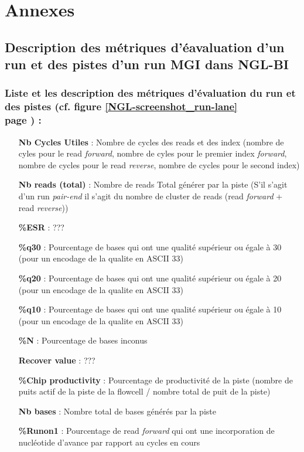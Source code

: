 \section{Annexes}
\subsection*{Description des métriques d'éavaluation d'un run et des pistes d'un run MGI dans NGL-BI}
\label{anexes1}
\subsubsection*{Liste et les description des métriques d'évaluation du run et des pistes (cf. figure \ref{NGL-screenshot_run-lane} \\page \pageref{NGL-screenshot_run-lane}) :}
\begin{itemize}
    \item[\textbf{Nb Cycles Utiles} :] Nombre de cycles des reads et des index (nombre de cyles pour le read \emph{forward}, nombre de cyles pour le premier index  \emph{forward}, nombre de cycles pour le read \emph{reverse}, nombre de cycles pour le second index)
    \item[\textbf{Nb reads (total)} :] Nombre de reads Total générer par la piste (S'il s'agit d'un run \emph{pair-end} il s'agit du nombre de cluster de reads (read \emph{forward} + read \emph{reverse}))
    \item[\textbf{\%ESR} :] ???
    \item[\textbf{\%q30} :] Pourcentage de bases qui ont une qualité supérieur ou égale à 30 (pour un encodage de la qualite en ASCII 33)
    \item[\textbf{\%q20} :] Pourcentage de bases qui ont une qualité supérieur ou égale à 20 (pour un encodage de la qualite en ASCII 33)
    \item[\textbf{\%q10} :] Pourcentage de bases qui ont une qualité supérieur ou égale à 10 (pour un encodage de la qualite en ASCII 33)
    \item[\textbf{\%N} :] Pourcentage de bases inconus
    \item[\textbf{Recover value} :] ???
    \item[\textbf{\%Chip productivity} :] Pourcentage de productivité de la piste (nombre de puits actif de la piste de la flowcell / nombre total de puit de la piste)
    \item[\textbf{Nb bases} :] Nombre total de bases générés par la piste
    \item[\textbf{\%Runon1} :] Pourcentage de read \emph{forward} qui ont une incorporation de nucléotide d'avance par rapport au cycles en cours

\end{itemize}
